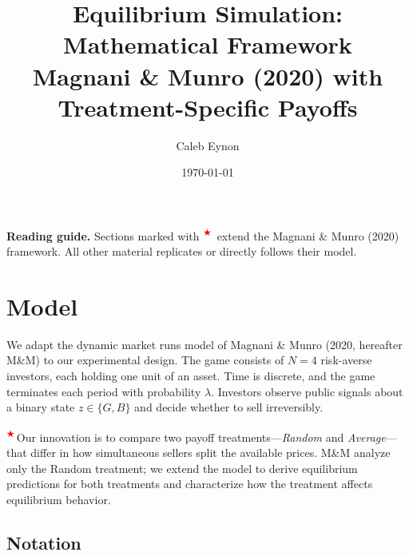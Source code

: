 \documentclass[11pt]{article}
\title{Equilibrium Simulation: Mathematical Framework\\
{\large Magnani \& Munro (2020) with Treatment-Specific Payoffs}}
\author{Caleb Eynon}
\date{\today}
\newcommand{\extension}{\textsuperscript{\textcolor{red}{$\bigstar$}}\,}
\begin{document}
\maketitle

\noindent\textbf{Reading guide.}
Sections marked with \extension{} extend the Magnani \& Munro (2020)
framework. All other material replicates or directly follows their model.

\tableofcontents
\newpage

\section{Model}

We adapt the dynamic market runs model of Magnani \& Munro (2020,
hereafter M\&M) to our experimental design. The game consists of $N = 4$
risk-averse investors, each holding one unit of an asset. Time is
discrete, and the game terminates each period with probability $\lambda$.
Investors observe public signals about a binary state
$z \in \{G, B\}$ and decide whether to sell irreversibly.

\extension Our innovation is to compare two payoff
treatments---\textit{Random} and \textit{Average}---that differ in how
simultaneous sellers split the available prices. M\&M analyze only the
Random treatment; we extend the model to derive equilibrium predictions
for both treatments and characterize how the treatment affects
equilibrium behavior.

\subsection{Notation}
\end{document}
